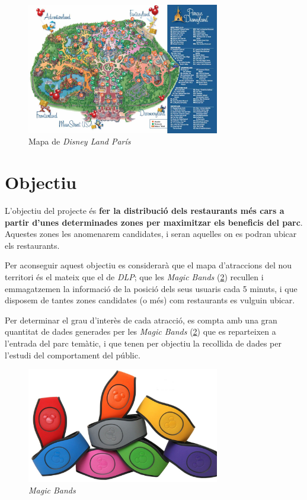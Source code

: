 \documentclass[12pt]{article}
\begin{document}
\begin{figure}[H]
    \centering
    \includegraphics[width=0.75\textwidth]{imatges/mapa_disney_land_paris.jpg}\par\vspace{1cm}
    \caption{Mapa de \textit{Disney Land París}}
    \label{fig:disney1}
\end{figure}

\clearpage
\section{Objectiu}
L'objectiu del projecte és \textbf{fer la distribució dels restaurants més cars a partir d'unes determinades zones  per maximitzar els beneficis del parc}. Aquestes zones les anomenarem candidates, i seran aquelles on es podran ubicar els restaurants.

Per aconseguir aquest objectiu es considerarà que el mapa d'atraccions del nou territori és el mateix que el de \textit{DLP}; que les \textit{Magic Bands} (\ref{fig:magic_bands}) recullen i emmagatzemen la informació de la posició dels seus usuaris cada 5 minuts, i que disposem de tantes zones candidates (o més) com restaurants es vulguin ubicar. 

Per determinar el grau d'interès de cada atracció, es compta amb una gran quantitat de dades generades per les \textit{Magic Bands} (\ref{fig:magic_bands}) que es reparteixen a l'entrada del parc temàtic, i que tenen per objectiu la recollida de dades per l'estudi del comportament del públic. 

\begin{figure}[H]
    \centering
    \includegraphics[width=0.75\textwidth]{imatges/magic_bands.jpg}\par\vspace{1cm}
    \caption{\textit{Magic Bands}}
    \label{fig:magic_bands}
\end{figure}
\end{document}
